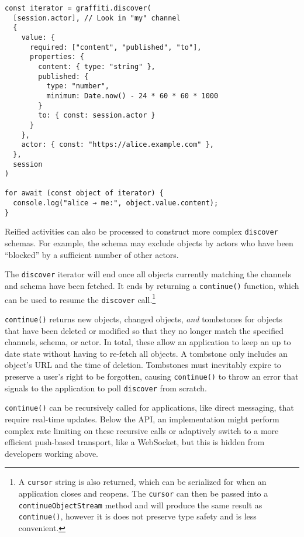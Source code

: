 \begin{verbatim}
const iterator = graffiti.discover(
  [session.actor], // Look in "my" channel
  {
    value: {
      required: ["content", "published", "to"],
      properties: {
        content: { type: "string" },
        published: {
          type: "number",
          minimum: Date.now() - 24 * 60 * 60 * 1000
        }
        to: { const: session.actor }
      }
    },
    actor: { const: "https://alice.example.com" },
  },
  session
)

for await (const object of iterator) {
  console.log("alice → me:", object.value.content);
}
\end{verbatim}

Reified activities can also be processed to construct more
complex \texttt{discover} schemas.
For example, the schema may exclude objects by
actors who have been ``blocked'' by a sufficient
number of other actors.

The \texttt{discover} iterator will end once all objects
currently matching the channels and schema have been fetched.
It ends by returning a
\texttt{continue()} function,
which can be used to resume
the \texttt{discover} call.\footnote{
    A \texttt{cursor} string is also returned, which can be
    serialized for when an application closes and reopens.
    The \texttt{cursor} can then be passed into a \texttt{continueObjectStream}
    method and will produce the same result as \texttt{continue()},
    however it is does not preserve type safety and is less convenient.
}

\texttt{continue()} returns new objects, changed objects, \emph{and}
tombstones for objects that have been deleted or modified so that they no longer match the
specified channels, schema, or actor.
In total, these allow an application to keep an up to date state
without having to re-fetch all objects.
A tombstone only includes an object's URL and the time of deletion.
Tombstones must inevitably expire to preserve a user's right to be forgotten,
causing \texttt{continue()} to throw an error
that signals to the application to poll \texttt{discover} from scratch.

\texttt{continue()} can be recursively called for applications,
like direct messaging, that require real-time updates.
Below the API, an implementation might perform complex rate limiting on these recursive calls or
adaptively switch to a more efficient push-based transport, like a WebSocket, but this is hidden from developers working above.

